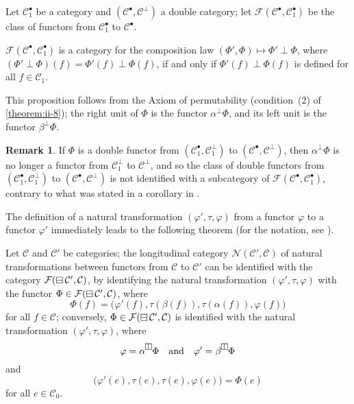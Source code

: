 \documentclass[a4paper,fleqn]{article}
\theoremstyle{plain}
\newenvironment{theorem}[1]
  {\renewcommand\theinnertheorem{#1}\innertheorem}
  {\endinnertheorem}
\newenvironment{proposition}[1]
  {\renewcommand\theinnerproposition{#1}\innerproposition}
  {\endinnerproposition}
\theoremstyle{definition}
\newtheorem*{remark}{Remark}
\newcommand{\oldpage}[1]{{\marginpar{\footnotesize$\bigg\vert$\,\,\,\,\textit{p.~#1}}}}
\newcommand{\textand}{\quad\text{and}\quad}
\newcommand{\CC}{\mathcal{C}}
\newcommand{\FF}{\mathcal{F}}
\newcommand{\NN}{\mathcal{N}}
\newcommand{\hsqbox}{{\boxminus}}
\newcommand{\vsqbox}{{\rotatebox{90}{$\boxminus$}}}
\DeclareMathOperator{\hsq}{\raisebox{-.05em}{$\hsqbox$}}
\begin{document}
Let $\CC_1^\bullet$ be a category and $(\CC^\bullet,\CC^\perp)$ a double category;
let $\FF(\CC^\bullet,\CC_1^\bullet)$ be the class of functors from $\CC_1^\bullet$ to $\CC^\bullet$.

\begin{proposition}{14}
\label{proposition:ii-14}
  $\FF(\CC^\bullet,\CC_1^\bullet)$ is a category for the composition law $(\Phi',\Phi)\mapsto\Phi'\perp\Phi$, where $(\Phi'\perp\Phi)(f)=\Phi'(f)\perp\Phi(f)$, if and only if $\Phi'(f)\perp\Phi(f)$ is defined for all $f\in\CC_1$.
\end{proposition}

This proposition follows from the Axiom of permutability (condition~(2) of \cref{theorem:ii-8});
the right unit of $\Phi$ is the functor $\alpha^\perp\Phi$, and its left unit is the functor $\beta^\perp\Phi$.

\begin{remark}
  If $\Phi$ is a double functor from $(\CC_1^\bullet,\CC_1^\perp)$ to $(\CC^\bullet,\CC^\perp)$, then $\alpha^\perp\Phi$ is no longer a functor from $\CC_1^\perp$ to $\CC^\perp$, and so the class of double functors from $(\CC_1^\bullet,\CC_1^\perp)$ to $(\CC^\bullet,\CC^\perp)$ is not identified with a subcategory of $\FF(\CC^\bullet,\CC_1^\bullet)$, contrary to what was stated in a corollary in \cite{3e}.
\end{remark}

The definition of a natural transformation $(\varphi',\tau,\varphi)$ from a functor $\varphi$ to a functor $\varphi'$ immediately leads to the following theorem (for the notation, see \cite{3d}).

\begin{theorem}{7}
\label{theorem:ii-7}
  Let $\CC$ and $\CC'$ be categories;
  the longitudinal category $\NN(\CC',\CC)$ of natural transformations between functors from $\CC$ to $\CC'$ can be identified with the category $\FF(\hsq\CC',\CC)$, by identifying the natural transformation $(\varphi',\tau,\varphi)$ with the functor $\Phi\in\FF(\hsq\CC',\CC)$, where
  \[
    \Phi(f)
    = \big(
      \varphi'(f), \tau(\beta(f)), \tau(\alpha(f)), \varphi(f)
    \big)
  \]
  for all $f\in\CC$;
  \oldpage{68}
  conversely, $\Phi\in\FF(\hsq\CC',\CC)$ is identified with the natural transformation $(\varphi',\tau,\varphi)$, where
  \[
    \varphi=\alpha^\vsqbox\Phi
    \textand
    \varphi'=\beta^\vsqbox\Phi
  \]
  and
  \[
    \big(
      \varphi'(e), \tau(e), \tau(e), \varphi(e)
    \big)
    = \Phi(e)
  \]
  for all $e\in\CC_0$.
\end{theorem}
\end{document}
